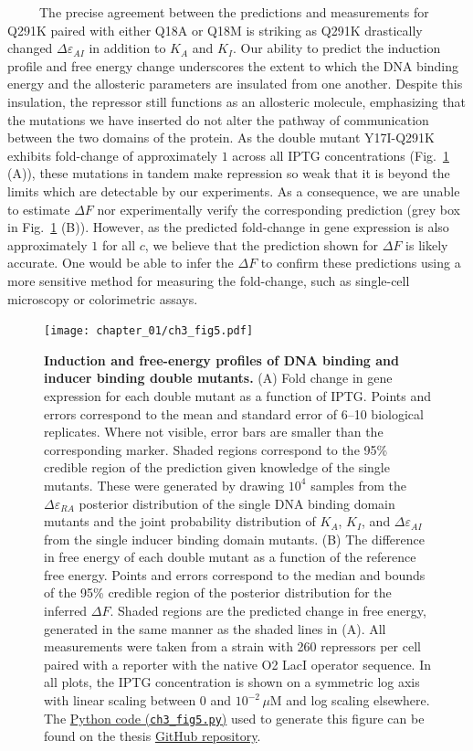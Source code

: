 \documentclass[12pt]{caltech_thesis}
\begin{document}
~~~~~The precise agreement between the predictions and measurements for
Q291K paired with either Q18A or Q18M is striking as Q291K drastically
changed \(\Delta\varepsilon_{AI}\) in addition to \(K_A\) and \(K_I\).
Our ability to predict the induction profile and free energy change
underscores the extent to which the DNA binding energy and the
allosteric parameters are insulated from one another. Despite this
insulation, the repressor still functions as an allosteric molecule,
emphasizing that the mutations we have inserted do not alter the pathway
of communication between the two domains of the protein. As the double
mutant Y17I-Q291K exhibits fold-change of approximately \(1\) across all
IPTG concentrations (Fig.~\ref{fig:dbl_muts} (A)), these mutations in
tandem make repression so weak that it is beyond the limits which are
detectable by our experiments. As a consequence, we are unable to
estimate \(\Delta F\) nor experimentally verify the corresponding
prediction (grey box in Fig.~\ref{fig:dbl_muts} (B)). However, as the
predicted fold-change in gene expression is also approximately \(1\) for
all \(c\), we believe that the prediction shown for \(\Delta F\) is
likely accurate. One would be able to infer the \(\Delta F\) to confirm
these predictions using a more sensitive method for measuring the
fold-change, such as single-cell microscopy or colorimetric assays.

\hypertarget{fig:dbl_muts}{%
\begin{figure}
\centering
\texttt{[image: chapter\_01/ch3\_fig5.pdf]}
\caption[{Induction and free-energy profiles of DNA binding and inducer
binding double mutants.}]{\textbf{Induction and free-energy profiles of
DNA binding and inducer binding double mutants.} (A) Fold change in gene
expression for each double mutant as a function of IPTG. Points and
errors correspond to the mean and standard error of 6--10 biological
replicates. Where not visible, error bars are smaller than the
corresponding marker. Shaded regions correspond to the 95\% credible
region of the prediction given knowledge of the single mutants. These
were generated by drawing \(10^4\) samples from the
\(\Delta\varepsilon_{RA}\) posterior distribution of the single DNA
binding domain mutants and the joint probability distribution of
\(K_A\), \(K_I\), and \(\Delta\varepsilon_{AI}\) from the single inducer
binding domain mutants. (B) The difference in free energy of each double
mutant as a function of the reference free energy. Points and errors
correspond to the median and bounds of the 95\% credible region of the
posterior distribution for the inferred \(\Delta F\). Shaded regions are
the predicted change in free energy, generated in the same manner as the
shaded lines in (A). All measurements were taken from a strain with 260
repressors per cell paired with a reporter with the native O2 LacI
operator sequence. In all plots, the IPTG concentration is shown on a
symmetric log axis with linear scaling between 0 and \(10^{-2}\,\mu\)M
and log scaling elsewhere. The
\href{https://github.com/gchure/phd/blob/master/src/chapter_03/code/ch3_fig5.py}{Python
code (\texttt{ch3\_fig5.py})} used to generate this figure can be found
on the thesis \href{https://github.com/gchure/phd}{GitHub repository}.}
\label{fig:dbl_muts}
\end{figure}
}
\end{document}
